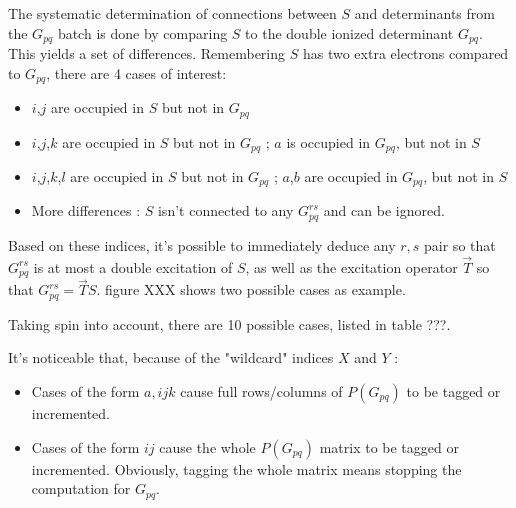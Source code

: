 The systematic determination of connections between $S$ and determinants from the $G_{pq}$ batch is done by comparing $S$ to the double ionized determinant $G_{pq}$. This yields a set of differences. Remembering $S$ has two extra electrons compared to $G_{pq}$, there are 4 cases of interest:
\begin{itemize}

\item
$i$,$j$ are occupied in $S$ but not in $G_{pq}$
\item
$i$,$j$,$k$ are occupied in $S$ but not in $G_{pq}$ ; $a$ is occupied in $G_{pq}$, but not in $S$
\item
$i$,$j$,$k$,$l$ are occupied in $S$ but not in $G_{pq}$ ; $a$,$b$ are occupied in $G_{pq}$, but not in $S$
\item
More differences : $S$ isn't connected to any $G_{pq}^{rs}$ and can be ignored. 

\end{itemize}

Based on these indices, it's possible to immediately deduce any $r,s$ pair so that $G_{pq}^{rs}$ is at most a double excitation of $S$, as well as the excitation operator $\overrightarrow{T}$ so that $G_{pq}^{rs}=\overrightarrow{T}S$. figure XXX shows two possible cases as example.

Taking spin into account, there are 10 possible cases, listed in table ???.


It's noticeable that, because of the "wildcard" indices $X$ and $Y$ :
\begin{itemize}

\item
Cases of the form $a,ijk$ cause full rows/columns of $P(G_{pq})$ to be tagged or incremented.
\item
Cases of the form $ij$ cause the whole $P(G_{pq})$ matrix to be tagged or incremented. Obviously, tagging the whole matrix means stopping the computation for $G_{pq}$.
\end{itemize}

